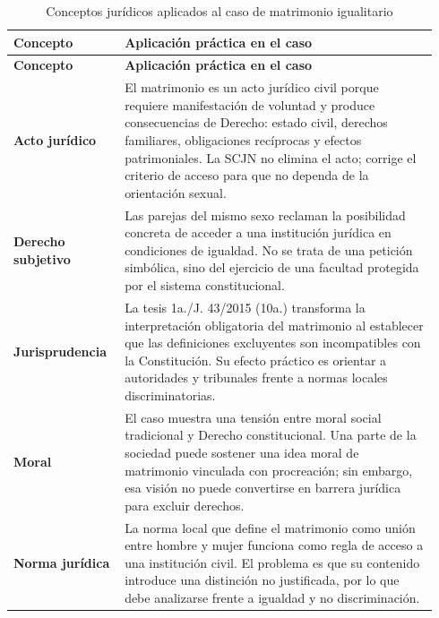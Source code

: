 \documentclass[
	spanish,
	letterpaper, oneside
]{article}
\begin{document}
\clearpage
\pagestyle{empty}
\begin{landscape}
\thispagestyle{empty}
\begingroup
\scriptsize
\setlength{\tabcolsep}{4pt}
\renewcommand{\arraystretch}{1.35}
\begin{longtable}{@{}p{0.24\linewidth}p{0.70\linewidth}@{}}
\caption{Conceptos jurídicos aplicados al caso de matrimonio igualitario}\label{tab:analisis-caso}\\
\toprule
\textbf{Concepto} & \textbf{Aplicación práctica en el caso} \\
\midrule
\endfirsthead
\toprule
\textbf{Concepto} & \textbf{Aplicación práctica en el caso} \\
\midrule
\endhead
\bottomrule
\endlastfoot

\textbf{Acto jurídico} &
El matrimonio es un acto jurídico civil porque requiere manifestación de voluntad y produce consecuencias de Derecho: estado civil, derechos familiares, obligaciones recíprocas y efectos patrimoniales. La SCJN no elimina el acto; corrige el criterio de acceso para que no dependa de la orientación sexual. \\
\midrule

\textbf{Derecho subjetivo} &
Las parejas del mismo sexo reclaman la posibilidad concreta de acceder a una institución jurídica en condiciones de igualdad. No se trata de una petición simbólica, sino del ejercicio de una facultad protegida por el sistema constitucional. \\
\midrule

\textbf{Jurisprudencia} &
La tesis 1a./J. 43/2015 (10a.) transforma la interpretación obligatoria del matrimonio al establecer que las definiciones excluyentes son incompatibles con la Constitución. Su efecto práctico es orientar a autoridades y tribunales frente a normas locales discriminatorias. \\
\midrule

\textbf{Moral} &
El caso muestra una tensión entre moral social tradicional y Derecho constitucional. Una parte de la sociedad puede sostener una idea moral de matrimonio vinculada con procreación; sin embargo, esa visión no puede convertirse en barrera jurídica para excluir derechos. \\
\midrule

\textbf{Norma jurídica} &
La norma local que define el matrimonio como unión entre hombre y mujer funciona como regla de acceso a una institución civil. El problema es que su contenido introduce una distinción no justificada, por lo que debe analizarse frente a igualdad y no discriminación. \\
\midrule


\end{longtable}
\end{landscape}
\end{document}
